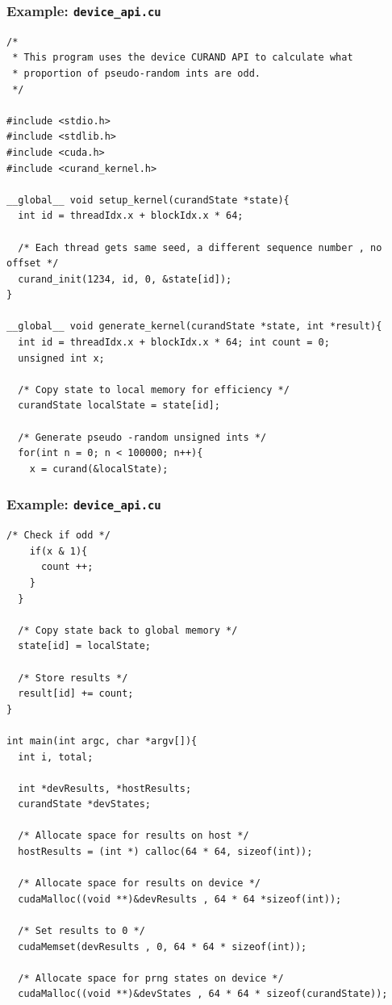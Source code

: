 \documentclass[handout]{beamer}
\numberwithin{equation}{section}
\begin{document}
\begin{frame}[fragile]
\frametitle{Example: {\tt device\_api.cu}} \lstset{basicstyle=\tiny}
\begin{lstlisting}[name=dev]
/*
 * This program uses the device CURAND API to calculate what 
 * proportion of pseudo-random ints are odd.
 */

#include <stdio.h>
#include <stdlib.h> 
#include <cuda.h>
#include <curand_kernel.h>

__global__ void setup_kernel(curandState *state){
  int id = threadIdx.x + blockIdx.x * 64;

  /* Each thread gets same seed, a different sequence number , no offset */
  curand_init(1234, id, 0, &state[id]); 
}

__global__ void generate_kernel(curandState *state, int *result){
  int id = threadIdx.x + blockIdx.x * 64; int count = 0;
  unsigned int x;

  /* Copy state to local memory for efficiency */ 
  curandState localState = state[id];
  
  /* Generate pseudo -random unsigned ints */ 
  for(int n = 0; n < 100000; n++){
    x = curand(&localState); 
\end{lstlisting}
\end{frame}


\begin{frame}[fragile]
\frametitle{Example: {\tt device\_api.cu}} \lstset{basicstyle=\tiny}
\begin{lstlisting}[name=dev]
    /* Check if odd */ 
    if(x & 1){
      count ++; 
    }
  }

  /* Copy state back to global memory */ 
  state[id] = localState;

  /* Store results */
  result[id] += count;
}

int main(int argc, char *argv[]){
  int i, total;

  int *devResults, *hostResults;
  curandState *devStates;

  /* Allocate space for results on host */ 
  hostResults = (int *) calloc(64 * 64, sizeof(int));
  
  /* Allocate space for results on device */ 
  cudaMalloc((void **)&devResults , 64 * 64 *sizeof(int));
  
  /* Set results to 0 */ 
  cudaMemset(devResults , 0, 64 * 64 * sizeof(int));
  
  /* Allocate space for prng states on device */ 
  cudaMalloc((void **)&devStates , 64 * 64 * sizeof(curandState)); 
 
\end{lstlisting}
\end{frame}
\end{document}
